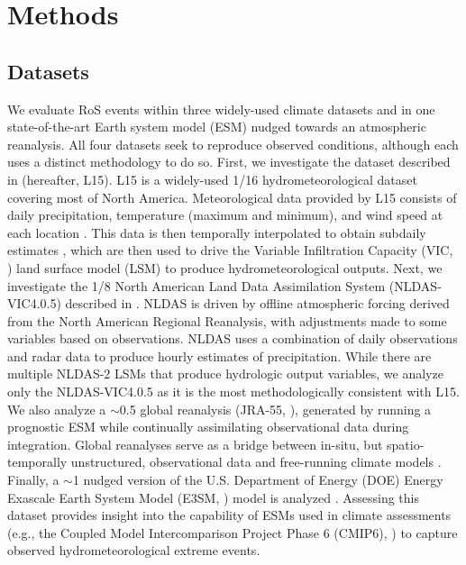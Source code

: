 \documentclass[nhess, manuscript]{copernicus}
\begin{document}
\section{Methods}
\label{sec:methods}

\subsection{Datasets}
\label{subsec:datasets}

We evaluate RoS events within three widely-used climate datasets and in one state-of-the-art Earth system model (ESM) nudged towards an atmospheric reanalysis.
All four datasets seek to reproduce observed conditions, although each uses a distinct methodology to do so.
First, we investigate the dataset described in \citet{livneh2015spatially} (hereafter, L15).
L15 is a widely-used 1/16\degree{} hydrometeorological dataset covering most of North America.
Meteorological data provided by L15 consists of daily precipitation, temperature (maximum and minimum), and wind speed at each location \citep{henn2018an}.
This data is then temporally interpolated to obtain subdaily estimates \citep{bohn2013global}, which are then used to drive the Variable Infiltration Capacity (VIC, \citet{liang1994simple}) land surface model (LSM) to produce hydrometeorological outputs.
Next, we investigate the 1/8\degree{} North American Land Data Assimilation System (NLDAS-VIC4.0.5)  described in \citet{xia2012continental1}.
NLDAS is driven by offline atmospheric forcing derived from the North American Regional Reanalysis, with adjustments made to some variables based on observations.
NLDAS uses a combination of daily observations and radar data to produce hourly estimates of precipitation.
While there are multiple NLDAS-2 LSMs that produce hydrologic output variables, we analyze only the NLDAS-VIC4.0.5 as it is the most methodologically consistent with L15.
We also analyze a $\sim$0.5\degree{} global reanalysis (JRA-55, \citet{kobayashi2015jra55}), generated by running a prognostic ESM while continually assimilating observational data during integration.
Global reanalyses serve as a bridge between in-situ, but spatio-temporally unstructured, observational data and free-running climate models \citep{parker2016reanalyses}.
Finally, a $\sim$1\degree{} nudged version of the U.S. Department of Energy (DOE) Energy Exascale Earth System Model (E3SM, \citet{golaz2022the}) model is analyzed \citep{zhang2022further}. Assessing this dataset provides insight into the capability of ESMs used in climate assessments (e.g., the Coupled Model Intercomparison Project Phase 6 (CMIP6), \citet{eyring2016overview}) to capture observed hydrometeorological extreme events.
\end{document}
